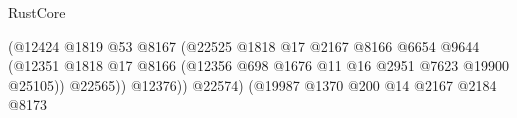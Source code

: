 \begin{lexlean}{RustCore}
\begin{coremodule}
                                                                    (@12424
                                                                      @1819
                                                                      @53
                                                                      @8167
                                                                      (@22525
                                                                        @1818
                                                                        @17
                                                                        @2167
                                                                        @8166
                                                                        @6654
                                                                        @9644
                                                                        (@12351
                                                                          @1818
                                                                          @17
                                                                          @8166
                                                                          (@12356
                                                                            @698
                                                                            @1676
                                                                            @11
                                                                            @16
                                                                            @2951
                                                                            @7623
                                                                            @19900
                                                                            @25105))
                                                                        @22565))
                                                                    @12376))
                                                                @22574)
                                                              (@19987
                                                                @1370
                                                                @200
                                                                @14
                                                                @2167
                                                                @2184
                                                                @8173

\end{coremodule}
\end{lexlean}
